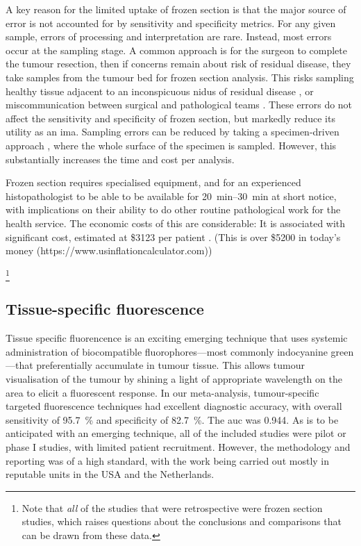 A key reason for the limited uptake of frozen section is that the major source of error is not accounted for by sensitivity and specificity metrics.
For any given sample, errors of processing and interpretation are rare.
Instead, most errors occur at the sampling stage.
A common approach is for the surgeon to complete the tumour resection, then if concerns remain about risk of residual disease, they take samples from the tumour bed for frozen section analysis\cite{layfieldFrozenSectionEvaluation2018}.
This risks sampling healthy tissue adjacent to an inconspicuous nidus of residual disease \cite{due.RefiningUtilityRole2016}, or miscommunication between surgical and pathological teams \cite{blackc.CriticalEvaluationFrozen2006}.
These errors do not affect the sensitivity and specificity of frozen section, but markedly reduce its utility as an \gls{ima}.
Sampling errors can be reduced by taking a specimen-driven approach \cite{maxwellEarlyOralTongue2015}, where the whole surface of the specimen is sampled.
However, this substantially increases the time and cost per analysis.

Frozen section requires specialised equipment, and for an experienced histopathologist to be able to be available for \SIrange{20}{30}{\minute} at short notice, with implications on their ability to do other routine pathological work for the health service. 
The economic costs of this are considerable: 
It is associated with significant cost, estimated at \$3123 per patient \cite{dinardoAccuracyUtilityCost2000}. 
(This is over \$5200 in today's money (https://www.usinflationcalculator.com))

\footnote{Note that \emph{all} of the studies that were retrospective were frozen section studies, which raises questions about the conclusions and comparisons that can be drawn from these data.}

\subsection{Tissue-specific fluorescence}

Tissue specific fluorencence is an exciting emerging technique that uses systemic administration of biocompatible fluorophores---most commonly indocyanine green---that preferentially accumulate in tumour tissue.
This allows tumour visualisation of the tumour by shining a light of appropriate wavelength on the area to elicit a fluorescent response.
In our meta-analysis, tumour-specific targeted fluorescence techniques had excellent diagnostic accuracy, with overall sensitivity of \SI{95.7}{\percent} and specificity of \SI{82.7}{\percent}. 
The \gls{auc} was 0.944.
As is to be anticipated with an emerging technique, all of the included studies were pilot or phase I studies, with limited patient recruitment. 
However, the methodology and reporting was of a high standard, with the work being carried out mostly in reputable units in the USA and the Netherlands.

